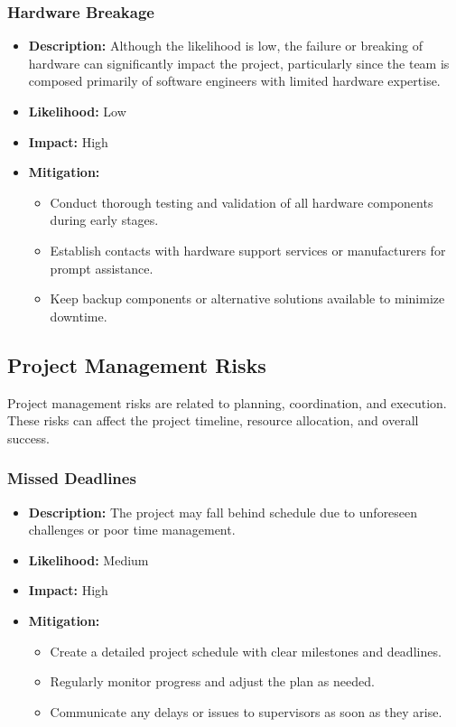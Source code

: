 \documentclass{article}
\begin{document}
\subsubsection{Hardware Breakage}
\begin{itemize}
    \item \textbf{Description:} Although the likelihood is low, the failure or breaking of hardware can significantly impact the project, particularly since the team is composed primarily of software engineers with limited hardware expertise.
    \item \textbf{Likelihood:} Low
    \item \textbf{Impact:} High
    \item \textbf{Mitigation:}
        \begin{itemize}
            \item Conduct thorough testing and validation of all hardware components during early stages.
            \item Establish contacts with hardware support services or manufacturers for prompt assistance.
            \item Keep backup components or alternative solutions available to minimize downtime.
        \end{itemize}
\end{itemize}

\subsection{Project Management Risks}
Project management risks are related to planning, coordination, and execution. These risks can affect the project timeline, resource allocation, and overall success.

\subsubsection{Missed Deadlines}
\begin{itemize}
    \item \textbf{Description:} The project may fall behind schedule due to unforeseen challenges or poor time management.
    \item \textbf{Likelihood:} Medium
    \item \textbf{Impact:} High
    \item \textbf{Mitigation:}
        \begin{itemize}
            \item Create a detailed project schedule with clear milestones and deadlines.
            \item Regularly monitor progress and adjust the plan as needed.
            \item Communicate any delays or issues to supervisors as soon as they arise.
        \end{itemize}
\end{itemize}
\end{document}
